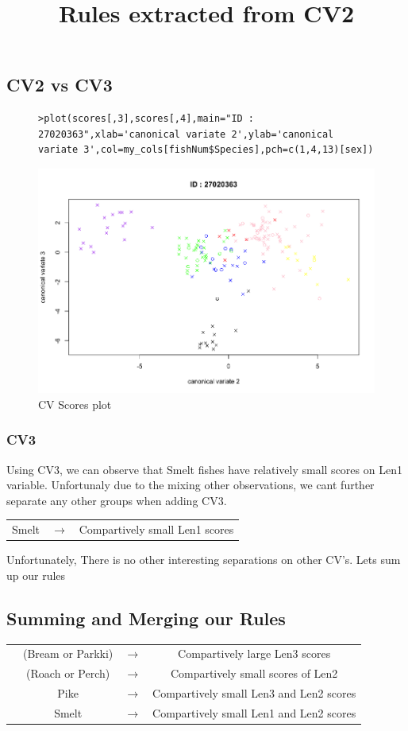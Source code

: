 \documentclass[openany]{article}
\begin{document}
		\subsection{CV2 vs CV3}
			\begin{figure}[H]
			\iftrue
				\begin{lstlisting}[style=myScalastyle]
				>plot(scores[,3],scores[,4],main="ID : 27020363",xlab='canonical variate 2',ylab='canonical variate 3',col=my_cols[fishNum$Species],pch=c(1,4,13)[sex])
				\end{lstlisting}
				\fi
			\end{figure}	
			\begin{figure}[H]
				\iftrue
				\caption{CV Scores plot}
				\centering
				\includegraphics[scale=0.2]{res/cv23}
				\fi
			\end{figure}
			\subsubsection{CV3}
				Using CV3, we can observe that Smelt fishes have relatively small scores on Len1 variable. Unfortunaly due to the mixing other observations, we 
				cant further separate any other groups when adding CV3.
				\begin{center}
					\begin{tabular}{ c c c }
						\title{Rules extracted from CV2}
						Smelt & $\rightarrow$ &Compartively small Len1 scores  \\ 
					\end{tabular}
				\end{center}
			Unfortunately, There is no other interesting separations on other CV's. Lets sum up our rules
		\subsection{Summing and Merging our Rules}
			\begin{tabular}{ c c c c }
				&(Bream or Parkki) &$\rightarrow$& Compartively large Len3 scores  \\ 
				&(Roach or Perch) &$\rightarrow$& Compartively small scores of Len2 \\ 
				&Pike & $\rightarrow$ &Compartively small Len3 and Len2 scores  \\
				&Smelt & $\rightarrow$ &Compartively small Len1 and Len2 scores  \\  
			\end{tabular}
\end{document}
